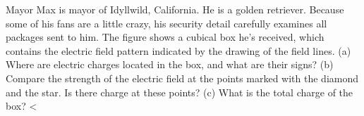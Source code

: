 Mayor Max is mayor of Idyllwild, California. He is a golden
retriever. Because some of his fans are a little crazy, his security detail
carefully examines all packages sent to him. The figure shows a cubical box he's
received, which contains the electric field pattern indicated by the
drawing of the field lines. (a) Where are electric charges located in the
box, and what are their signs? (b) Compare the strength of the electric
field at the points marked with the diamond and the star. Is there charge
at these points? (c) What is the total charge of the box?
        <%

